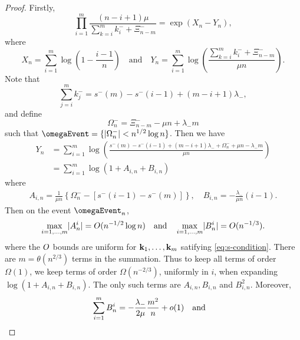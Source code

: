 \begin{proof}
    Firstly,
    \begin{equation*}
        \prod_{i=1}^m \frac{(n-i+1)\mu}{\sum_{k=i}^m k^-_i + \Xi^-_{n-m}} = \exp(X_n - Y_n),
    \end{equation*}
    where
    \begin{equation*}
        X_n = \sum_{i=1}^m \log\left( 1 - \frac{i-1}{n} \right)
        \quad \text{and} \quad
        Y_n = \sum_{i=1}^m \log\left( \frac{\sum_{k=i}^m k_i^- + \Xi^-_{n-m}}{\mu n} \right).
    \end{equation*}
    Note that
    \begin{equation*}
        \sum_{j=i}^m k^-_j = s^-(m) - s^-(i - 1) + (m - i + 1) \lambda_-,
    \end{equation*}
    and define
    \begin{equation*}
        \Omega^-_n = \Xi^-_{n-m} - \mu n + \lambda_- m
    \end{equation*}
    such that $\omegaEvent = \{ \abs{\Omega^-_n} < n^{1/2} \log n \}$. Then we have
    \begin{align*}
        Y_n 
        &= \sum_{i=1}^m \log \left( \frac{s^-(m) - s^-(i-1) + (m - i + 1) \lambda_- + \Omega^-_n + \mu n - \lambda_- m}{\mu n} \right) \\
        &= \sum_{i=1}^m \log \left( 1 + A_{i, n} + B_{i, n} \right)
    \end{align*}
    where
    \begin{align*}
        A_{i, n} = \frac{1}{\mu n} \left\{ 
            \Omega_n^- -\left[ s^-(i-1) - s^-(m) \right] 
        \right\}, \quad
        B_{i, n} = - \frac{\lambda_-}{\mu n} (i-1).
    \end{align*}
    Then on the event $\omegaEvent_n$,
    \begin{equation*}
        \max_{i=1, \ldots, m} \lvert A_n^i\rvert = O(n^{-1/2} \log n)
        \quad \text{and} \quad
        \max_{i=1, \ldots, m} \lvert B_n^i\rvert = O(n^{-1/3}).
    \end{equation*}
    where the $O$ bounds are uniform for ${\mathbf k}_1, \ldots, {\mathbf k}_m$ satifying \cref{eq:s-condition}. There are $m = \theta(n^{2/3})$ terms in the summation. Thus to keep all terms of order $\Omega(1)$, we keep terms of order $\Omega(n^{-2/3})$, uniformly in $i$, when expanding $\log(1 + A_{i, n} + B_{i, n})$. The only such terms are $A_{i, n}, B_{i, n}$ and $B_{i, n}^2$. Moreover,
    \begin{equation*}
        \sum_{i=1}^m B_n^i = - \frac{\lambda_-}{2 \mu} \frac{m^2}{n} + \littleo(1) \quad \text{and} \quad

\end{equation*}
\end{proof}
